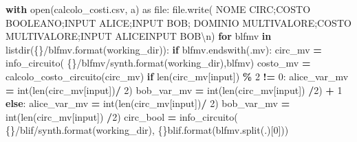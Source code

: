\documentclass[
  italian,
]{book}
\newenvironment{Shaded}{\begin{snugshade}}{\end{snugshade}}
\newcommand{\BuiltInTok}[1]{#1}
\newcommand{\CharTok}[1]{\textcolor[rgb]{0.31,0.60,0.02}{#1}}
\newcommand{\ControlFlowTok}[1]{\textcolor[rgb]{0.13,0.29,0.53}{\textbf{#1}}}
\newcommand{\DecValTok}[1]{\textcolor[rgb]{0.00,0.00,0.81}{#1}}
\newcommand{\ImportTok}[1]{#1}
\newcommand{\KeywordTok}[1]{\textcolor[rgb]{0.13,0.29,0.53}{\textbf{#1}}}
\newcommand{\NormalTok}[1]{#1}
\newcommand{\OperatorTok}[1]{\textcolor[rgb]{0.81,0.36,0.00}{\textbf{#1}}}
\newcommand{\SpecialCharTok}[1]{\textcolor[rgb]{0.00,0.00,0.00}{#1}}
\newcommand{\StringTok}[1]{\textcolor[rgb]{0.31,0.60,0.02}{#1}}
\begin{document}
\begin{Shaded}
\begin{Highlighting}[]
\ControlFlowTok{with} \BuiltInTok{open}\NormalTok{(}\StringTok{\textquotesingle{}calcolo\_costi.csv\textquotesingle{}}\NormalTok{, }\StringTok{\textquotesingle{}a\textquotesingle{}}\NormalTok{) }\ImportTok{as} \BuiltInTok{file}\NormalTok{:}
  \BuiltInTok{file}\NormalTok{.write(}
    \StringTok{\textquotesingle{}NOME CIRC;COSTO BOOLEANO;INPUT ALICE;INPUT BOB;}
\StringTok{    DOMINIO MULTIVALORE;COSTO MULTIVALORE;INPUT ALICEINPUT BOB}\CharTok{\textbackslash{}n}\StringTok{\textquotesingle{}}\NormalTok{)}
  \ControlFlowTok{for}\NormalTok{ blfmv }\KeywordTok{in}\NormalTok{ listdir(}\StringTok{\textquotesingle{}}\SpecialCharTok{\{\}}\StringTok{/blfmv\textquotesingle{}}\NormalTok{.}\BuiltInTok{format}\NormalTok{(working\_dir)):}
    \ControlFlowTok{if}\NormalTok{ blfmv.endswith(}\StringTok{\textquotesingle{}.mv\textquotesingle{}}\NormalTok{):}
\NormalTok{      circ\_mv }\OperatorTok{=}\NormalTok{ info\_circuito(}
          \StringTok{\textquotesingle{}}\SpecialCharTok{\{\}}\StringTok{/blfmv/synth\textquotesingle{}}\NormalTok{.}\BuiltInTok{format}\NormalTok{(working\_dir),blfmv)}
\NormalTok{      costo\_mv }\OperatorTok{=}\NormalTok{ calcolo\_costo\_circuito(circ\_mv)}
      \ControlFlowTok{if} \BuiltInTok{len}\NormalTok{(circ\_mv[}\StringTok{\textquotesingle{}input\textquotesingle{}}\NormalTok{]) }\OperatorTok{\%} \DecValTok{2} \OperatorTok{!=} \DecValTok{0}\NormalTok{:}
\NormalTok{          alice\_var\_mv }\OperatorTok{=} \BuiltInTok{int}\NormalTok{(}\BuiltInTok{len}\NormalTok{(circ\_mv[}\StringTok{\textquotesingle{}input\textquotesingle{}}\NormalTok{])}\OperatorTok{/} \DecValTok{2}\NormalTok{)}
\NormalTok{          bob\_var\_mv }\OperatorTok{=} \BuiltInTok{int}\NormalTok{(}\BuiltInTok{len}\NormalTok{(circ\_mv[}\StringTok{\textquotesingle{}input\textquotesingle{}}\NormalTok{]) }\OperatorTok{/}\DecValTok{2}\NormalTok{) }\OperatorTok{+} \DecValTok{1}
      \ControlFlowTok{else}\NormalTok{:}
\NormalTok{          alice\_var\_mv }\OperatorTok{=} \BuiltInTok{int}\NormalTok{(}\BuiltInTok{len}\NormalTok{(circ\_mv[}\StringTok{\textquotesingle{}input\textquotesingle{}}\NormalTok{])}\OperatorTok{/} \DecValTok{2}\NormalTok{)}
\NormalTok{          bob\_var\_mv }\OperatorTok{=} \BuiltInTok{int}\NormalTok{(}\BuiltInTok{len}\NormalTok{(circ\_mv[}\StringTok{\textquotesingle{}input\textquotesingle{}}\NormalTok{]) }\OperatorTok{/}\DecValTok{2}\NormalTok{)}
\NormalTok{      circ\_bool }\OperatorTok{=}\NormalTok{ info\_circuito(}
          \StringTok{\textquotesingle{}}\SpecialCharTok{\{\}}\StringTok{/blif/synth\textquotesingle{}}\NormalTok{.}\BuiltInTok{format}\NormalTok{(working\_dir), }\StringTok{\textquotesingle{}}\SpecialCharTok{\{\}}\StringTok{blif\textquotesingle{}}\NormalTok{.}\BuiltInTok{format}\NormalTok{(blfmv.split(}\StringTok{\textquotesingle{}.\textquotesingle{}}\NormalTok{)[}\DecValTok{0}\NormalTok{]))}

\end{Highlighting}
\end{Shaded}
\end{document}
